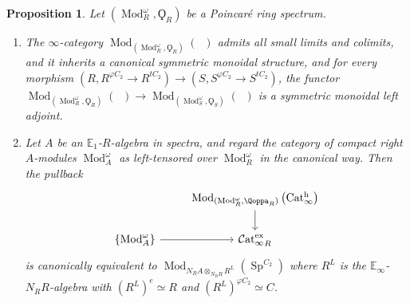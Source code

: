 \documentclass{article}
\DeclareMathOperator{\Cat}{\mathcal{C}at} %
\DeclareMathOperator{\Catex}{\Cat_\infty^{ex}} %
\DeclareMathOperator{\Cath}{Cat^h_\infty} %
\DeclareMathOperator{\Catpidem}{Cat^p_{\infty, idem}} %
\DeclareMathOperator{\Mod}{Mod} %
\DeclareMathOperator{\Spectra}{Sp} %
\newcommand{\EE}{\mathbb{E}}
\newtheorem{proposition}[equation]{Proposition}
\theoremstyle{definition}
\begin{document}
\begin{proposition}\label{prop:relative_poincare_cats_basic_properties}
    Let $ (\Mod_R^\omega, \Qoppa_R) $ be a Poincaré ring spectrum. 
    \begin{enumerate}
        \item \label{propitem:Rlin_Poincare_cats_is_symm_mon} The $ \infty $-category $ \Mod_{\left(\Mod_R^\omega, \Qoppa_R \right)}(\Catpidem) $ admits all small limits and colimits, and it inherits a canonical symmetric monoidal structure, and for every morphism $ \left(R, R^{\varphi C_2} \to R^{tC_2}\right) \to (S, S^{\varphi C_2} \to S^{tC_2}) $, the functor $ \Mod_{\left(\Mod_R^\omega, \Qoppa_R \right)}(\Catpidem) \to \Mod_{\left(\Mod_S^\omega, \Qoppa_S \right)}(\Catpidem) $ is a symmetric monoidal left adjoint. 
        \item \label{propitem:classify_R_lin_hermitian_struct} Let $ A $ be an $ \EE_1 $-$ R $-algebra in spectra, and regard the category of compact right $ A $-modules $ \Mod_A^\omega $ as left-tensored over $ \Mod_R^\omega $ in the canonical way. 
        Then the pullback
        \begin{equation}
        \begin{tikzcd}
            & \Mod_{(\Mod_R^\omega, \Qoppa_R)}\left(\Cath\right) \ar[d] \\
            \{\Mod_A^\omega\} \ar[r] & \Catex_R
        \end{tikzcd}
        \end{equation}
        is canonically equivalent to $ \Mod_{N_R A \otimes_{N_R R} R^L }\left(\Spectra^{C_2}\right) $ where $ R^L $ is the $ \EE_\infty $-$ N_R R $-algebra with $ (R^L)^e \simeq R $ and $ (R^L)^{\varphi C_2}  \simeq C $. 


\end{enumerate}
\end{proposition}
\end{document}
